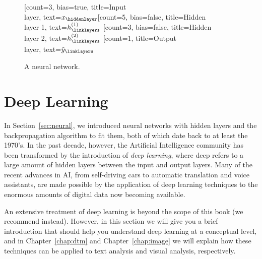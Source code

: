 \begin{figure}
  \centering
 \begin{neuralnetwork}[height=5]
        \newcommand{\x}[2]{$x_#2$}
        \newcommand{\y}[2]{$\hat{y}_#2$}
        \newcommand{\hfirst}[2]{\small $h^{(1)}_#2$}
        \newcommand{\hsecond}[2]{\small $h^{(2)}_#2$}
        [count=3, bias=true, title=Input\\layer, text=\x]
        \hiddenlayer[count=5, bias=false, title=Hidden\\layer 1, text=\hfirst] \linklayers
        \hiddenlayer[count=3, bias=false, title=Hidden\\layer 2, text=\hsecond] \linklayers
        \outputlayer[count=1, title=Output\\layer, text=\y] \linklayers
 \end{neuralnetwork}
\caption{A neural network. \label{fig:hiddenlayers}}
\end{figure}




%

\section{Deep Learning}
\label{sec:deeplearning}

In Section~\ref{sec:neural}, we introduced neural networks with hidden layers and the backpropagation algorithm to fit them,
both of which date back to at least the 1970's.
In the past decade, however, the Artificial Intelligence community has been transformed by the introduction of
\emph{deep learning},
where deep refers to a large amount of hidden layers between the input and output layers.
Many of the recent advances in AI, from self-driving cars to automatic translation and voice assistants,
are made possible by the application of deep learning techniques to the enormous amounts of digital data now becoming available.

An extensive treatment of deep learning is beyond the scope of this book (we recommend \cite{geron2019hands} instead).
However, in this section we will give you a brief introduction that should help you understand deep learning at a conceptual level,
and in Chapter~\ref{chap:dtm} and Chapter~\ref{chap:image} we will explain how these techniques can be applied to text analysis and visual analysis, respectively.

